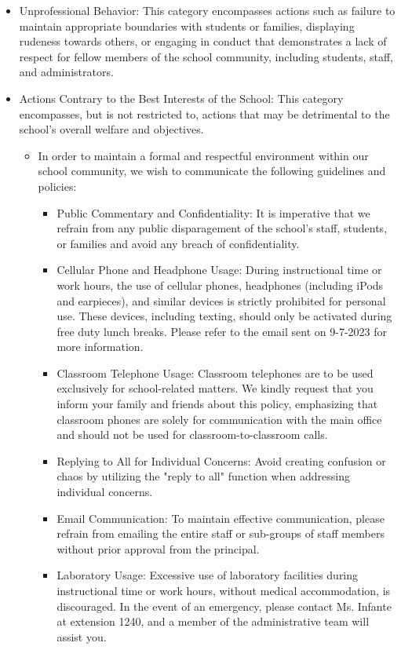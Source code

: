 \documentclass[11pt, letterpaper]{article}
\begin{document}
\begin{itemize}
\item Unprofessional Behavior: This category encompasses actions such as failure to maintain appropriate boundaries with students or families, displaying rudeness towards others, or engaging in conduct that demonstrates a lack of respect for fellow members of the school community, including students, staff, and administrators.
\item Actions Contrary to the Best Interests of the School: This category encompasses, but is not restricted to, actions that may be detrimental to the school's overall welfare and objectives.
	\begin{itemize}
	\item In order to maintain a formal and respectful environment within our school community, we wish to communicate the following guidelines and policies:
	\begin{itemize}
	\item Public Commentary and Confidentiality: It is imperative that we refrain from any public disparagement of the school’s staff, students, or families and avoid any breach of confidentiality.
	\item Cellular Phone and Headphone Usage: During instructional time or work hours, the use of cellular phones, headphones (including iPods and earpieces), and similar devices is strictly prohibited for personal use. These devices, including texting, should only be activated during free duty lunch breaks. Please refer to the email sent on 9-7-2023 for more information.
	\item Classroom Telephone Usage: Classroom telephones are to be used exclusively for school-related matters. We kindly request that you inform your family and friends about this policy, emphasizing that classroom phones are solely for communication with the main office and should not be used for classroom-to-classroom calls.
	\item Replying to All for Individual Concerns: Avoid creating confusion or chaos by utilizing the "reply to all" function when addressing individual concerns.
	\item Email Communication: To maintain effective communication, please refrain from emailing the entire staff or sub-groups of staff members without prior approval from the principal.
	\item Laboratory Usage: Excessive use of laboratory facilities during instructional time or work hours, without medical accommodation, is discouraged. In the event of an emergency, please contact Ms. Infante at extension 1240, and a member of the administrative team will assist you.

\end{itemize}
\end{itemize}
\end{itemize}
\end{document}
